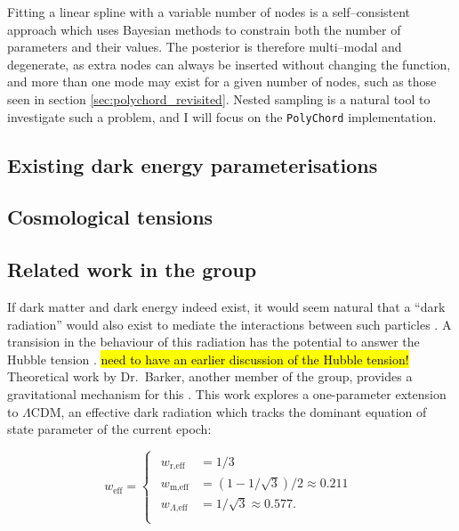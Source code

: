 \documentclass{article}
\begin{document}
Fitting a linear spline with a variable number of nodes is a self--consistent approach which uses Bayesian methods to constrain both the number of parameters and their values. The posterior is therefore multi--modal and degenerate, as extra nodes can always be inserted without changing the function, and more than one mode may exist for a given number of nodes, such as those seen in section \ref{sec:polychord_revisited}. Nested sampling is a natural tool to investigate such a problem, and I will focus on the \texttt{PolyChord} implementation.

\subsection{Existing dark energy parameterisations}

\subsection{Cosmological tensions}

\subsection{Related work in the group}
\label{sec:barker}
If dark matter and dark energy indeed exist, it would seem natural that a ``dark radiation'' would also exist to mediate the interactions between such particles \cite{Ackerman_2009}. A transision in the behaviour of this radiation has the potential to answer the Hubble tension \cite{Aloni_2022}. \hl{need to have an earlier discussion of the Hubble tension!} Theoretical work by Dr.~Barker, another member of the group, provides a gravitational mechanism for this \cite{Barker_2020}. This work explores a one-parameter extension to $\Lambda$CDM, an effective dark radiation which tracks the dominant equation of state parameter of the current epoch: 

\begin{equation}
  w_\textrm{eff} = 
  \begin{cases}
    \begin{aligned}
      w_\textrm{r,eff} &= 1/3 \\
      w_\textrm{m,eff} &= (1-1/\sqrt{3}) / 2 \approx 0.211 \\
      w_{\Lambda \textrm{,eff}} &= 1/\sqrt{3} \approx 0.577 \textrm{.} \\
    \end{aligned}
  \end{cases}
\end{equation}
\end{document}
